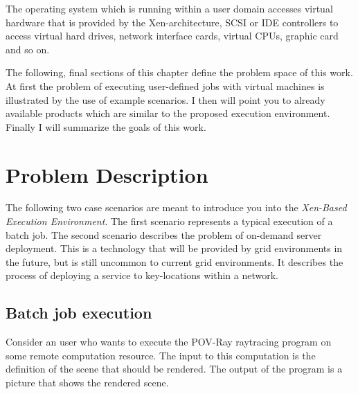 The  operating system  which  is  running within  a  user domain  accesses
virtual hardware that is provided by the Xen-architecture, \eg SCSI or IDE
controllers  to  access  virtual  hard drives,  network  interface  cards,
virtual CPUs, graphic card and so on.

The following, final sections of  this chapter define the problem space of
this  work. At  first  the  problem of  executing  user-defined jobs  with
virtual machines is  illustrated by the use of  example scenarios.  I then
will  point you to  already available  products which  are similar  to the
proposed execution environment. Finally I will summarize the goals of this
work.

\section{Problem Description}
\label{sec:problem-description}

The  following two  case scenarios  are meant  to introduce  you  into the
\emph{Xen-Based  Execution Environment}. The  first scenario  represents a
typical  execution of  a  batch  job. The  second  scenario describes  the
problem of on-demand server deployment.  This is a technology that will be
provided  by grid environments  in the  future, but  is still  uncommon to
current grid environments. It describes the process of deploying a service
to key-locations within a network.

\subsection{Batch job execution}

Consider  an user  who wants  to  execute the  POV-Ray raytracing  program
\cite{POV-Ray}  on some remote  computation resource.   The input  to this
computation is  the definition of the  scene that should  be rendered. The
output of the program is a picture that shows the rendered scene.

